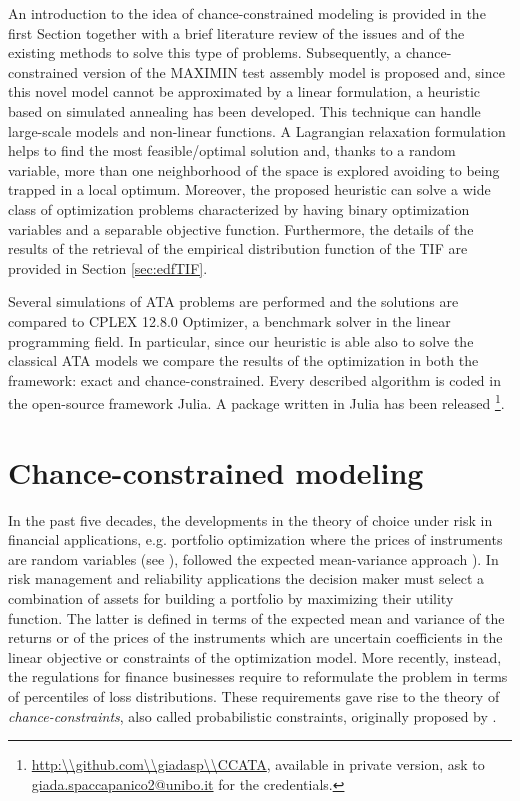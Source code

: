 An introduction to the idea of chance-constrained modeling is provided in the first Section together with a brief literature review of the issues and of the existing methods to solve this type of problems. Subsequently, a chance-constrained version of the MAXIMIN test assembly model is proposed and, since this novel model cannot be approximated by a linear formulation, a heuristic based on simulated annealing \parencite{goffe1996simann} has been developed. This technique can handle large-scale models and non-linear functions. A Lagrangian relaxation formulation helps to find the most feasible/optimal solution and, thanks to a random variable, more than one neighborhood of the space is explored avoiding to being trapped in a local optimum. Moreover, the proposed heuristic can solve a wide class of optimization problems characterized by having binary optimization variables and a separable objective function. Furthermore, the details of the results of the retrieval of the empirical distribution function of the TIF are provided in Section \ref{sec:edfTIF}.

Several simulations of ATA problems are performed and the solutions are compared to CPLEX 12.8.0 Optimizer, a benchmark solver in the linear programming field. In particular, since our heuristic is able also to solve the classical ATA models we compare the results of the optimization in both the framework: exact and chance-constrained. Every described algorithm is coded in the open-source framework Julia. A package written in Julia has been released \footnote{\url{http:\\github.com\\giadasp\\CCATA}, available in private version, ask to \url{giada.spaccapanico2@unibo.it} for the credentials.}.

\section{Chance-constrained modeling}

In the past five decades, the developments in the theory of choice under risk in financial applications, e.g. portfolio optimization where the prices of instruments are random variables (see \textcite{rockafellar2000optimization,rockafellar2001uryasev}),  followed the expected mean-variance approach \parencite{chen1973quadratic,freund1956introduction,scott1972practical}). In risk management and reliability applications the decision maker must select a combination of assets for building a portfolio by maximizing their utility function. The latter is defined in terms of the expected mean and variance of the returns or of the prices of the instruments which are uncertain coefficients in the linear objective or constraints of the optimization model. More recently, instead, the regulations for finance businesses require to reformulate the problem in terms of percentiles of loss distributions. These requirements gave rise to the theory of \emph{chance-constraints}, also called probabilistic constraints, originally proposed by \textcite{Charnes1959}. 

